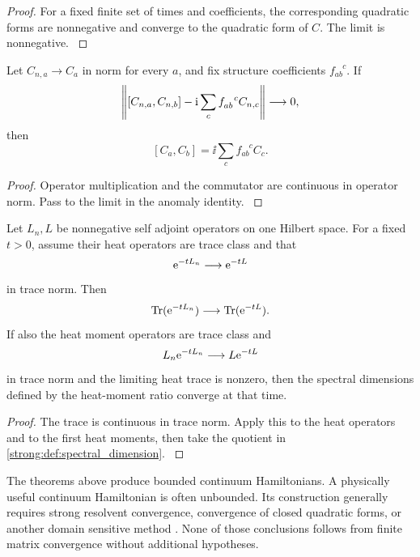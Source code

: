 \begin{proof}\label{strong:proof:077}
For a fixed finite set of times and coefficients, the corresponding quadratic forms are nonnegative and converge to the quadratic form of \(C\). The limit is nonnegative.
\label{strong:proof:077:end}\end{proof}

\begin{theorem}\label{strong:theorem:049}\label{strong:thm:constraint_limit}
Let \(C_{n,a}\to C_a\) in norm for every \(a\), and fix structure coefficients \(f_{ab}^{\phantom{ab}c}\). If
\[
\norm{
[C_{n,a},C_{n,b}]
-\ii\sum_cf_{ab}^{\phantom{ab}c}C_{n,c}
}
\longrightarrow0,
\]
then
\[
[C_a,C_b]
=\ii\sum_cf_{ab}^{\phantom{ab}c}C_c.
\]
\end{theorem}

\begin{proof}\label{strong:proof:078}
Operator multiplication and the commutator are continuous in operator norm. Pass to the limit in the anomaly identity.
\label{strong:proof:078:end}\end{proof}

\begin{theorem}\label{strong:theorem:050}\label{strong:thm:trace_norm_heat}
Let \(L_n,L\) be nonnegative self adjoint operators on one Hilbert space. For a fixed \(t>0\), assume their heat operators are trace class and that
\[
\e^{-tL_n}\longrightarrow\e^{-tL}
\]
in trace norm. Then
\[
\Tr(\e^{-tL_n})\longrightarrow\Tr(\e^{-tL}).
\]
If also the heat moment operators are trace class and
\[
L_n\e^{-tL_n}\longrightarrow L\e^{-tL}
\]
in trace norm and the limiting heat trace is nonzero, then the spectral dimensions defined by the heat-moment ratio converge at that time.
\end{theorem}

\begin{proof}\label{strong:proof:079}
The trace is continuous in trace norm. Apply this to the heat operators and to the first heat moments, then take the quotient in \cref{strong:def:spectral_dimension}.
\label{strong:proof:079:end}\end{proof}

\begin{remark}\label{strong:remark:003}\label{strong:rem:unbounded_limit}
The theorems above produce bounded continuum Hamiltonians. A physically useful continuum Hamiltonian is often unbounded. Its construction generally requires strong resolvent convergence, convergence of closed quadratic forms, or another domain sensitive method \cite{Kato1995,ReedSimon1972}. None of those conclusions follows from finite matrix convergence without additional hypotheses.
\end{remark}

